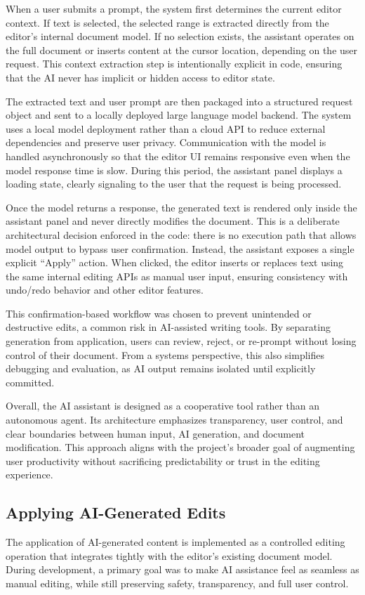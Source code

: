 \documentclass[sigconf]{acmart}
\begin{document}
When a user submits a prompt, the system first determines the current editor context. If text is selected, the selected range is extracted directly from the editor’s internal document model. If no selection exists, the assistant operates on the full document or inserts content at the cursor location, depending on the user request. This context extraction step is intentionally explicit in code, ensuring that the AI never has implicit or hidden access to editor state.

The extracted text and user prompt are then packaged into a structured request object and sent to a locally deployed large language model backend. The system uses a local model deployment rather than a cloud API to reduce external dependencies and preserve user privacy. Communication with the model is handled asynchronously so that the editor UI remains responsive even when the model response time is slow. During this period, the assistant panel displays a loading state, clearly signaling to the user that the request is being processed.

Once the model returns a response, the generated text is rendered only inside the assistant panel and never directly modifies the document. This is a deliberate architectural decision enforced in the code: there is no execution path that allows model output to bypass user confirmation. Instead, the assistant exposes a single explicit “Apply” action. When clicked, the editor inserts or replaces text using the same internal editing APIs as manual user input, ensuring consistency with undo/redo behavior and other editor features.

This confirmation-based workflow was chosen to prevent unintended or destructive edits, a common risk in AI-assisted writing tools. By separating generation from application, users can review, reject, or re-prompt without losing control of their document. From a systems perspective, this also simplifies debugging and evaluation, as AI output remains isolated until explicitly committed.

Overall, the AI assistant is designed as a cooperative tool rather than an autonomous agent. Its architecture emphasizes transparency, user control, and clear boundaries between human input, AI generation, and document modification. This approach aligns with the project’s broader goal of augmenting user productivity without sacrificing predictability or trust in the editing experience.

\subsection{Applying AI-Generated Edits}
The application of AI-generated content is implemented as a controlled editing operation that integrates tightly with the editor’s existing document model. During development, a primary goal was to make AI assistance feel as seamless as manual editing, while still preserving safety, transparency, and full user control.
\end{document}
